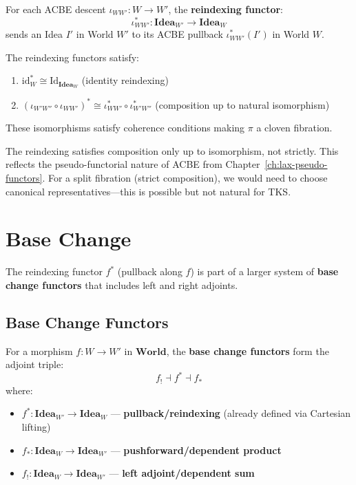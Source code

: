 \begin{definition}
\label{def:reindexing-functor}
For each ACBE descent $\iota_{WW'} : W \to W'$, the \textbf{reindexing functor}:
\[
  \iota_{WW'}^* : \mathbf{Idea}_{W'} \longrightarrow \mathbf{Idea}_W
\]
sends an Idea $I'$ in World $W'$ to its ACBE pullback $\iota_{WW'}^*(I')$ in World $W$.
\end{definition}

\begin{proposition}
\label{prop:reindexing-preserves}
The reindexing functors satisfy:
\begin{enumerate}
  \item $\mathrm{id}_W^* \cong \mathrm{Id}_{\mathbf{Idea}_W}$ (identity reindexing)
  \item $(\iota_{W'W''} \circ \iota_{WW'})^* \cong \iota_{WW'}^* \circ \iota_{W'W''}^*$
        (composition up to natural isomorphism)
\end{enumerate}
These isomorphisms satisfy coherence conditions making $\pi$ a cloven fibration.
\end{proposition}

\begin{remark}
The reindexing satisfies composition only up to isomorphism, not strictly.
This reflects the pseudo-functorial nature of ACBE from
Chapter~\ref{ch:lax-pseudo-functors}. For a split fibration (strict
composition), we would need to choose canonical representatives---this
is possible but not natural for TKS.
\end{remark}

\section{Base Change}
\label{sec:base-change}

The reindexing functor $f^*$ (pullback along $f$) is part of a larger system
of \textbf{base change functors} that includes left and right adjoints.

\subsection{Base Change Functors}
\label{subsec:base-change-functors}

\begin{definition}
\label{def:base-change-triple}
For a morphism $f : W \to W'$ in $\mathbf{World}$, the \textbf{base change functors}
form the adjoint triple:
\[
  f_! \dashv f^* \dashv f_*
\]
where:
\begin{itemize}
  \item $f^* : \mathbf{Idea}_{W'} \to \mathbf{Idea}_W$ --- \textbf{pullback/reindexing}
        (already defined via Cartesian lifting)
  \item $f_* : \mathbf{Idea}_W \to \mathbf{Idea}_{W'}$ --- \textbf{pushforward/dependent product}
  \item $f_! : \mathbf{Idea}_W \to \mathbf{Idea}_{W'}$ --- \textbf{left adjoint/dependent sum}
\end{itemize}
\end{definition}

